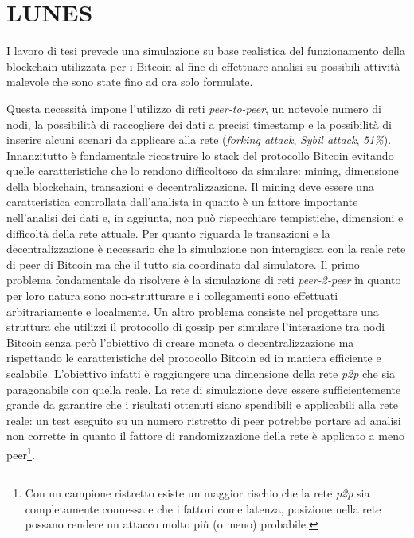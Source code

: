 \chapter{LUNES}
I lavoro di tesi prevede una simulazione su base realistica del funzionamento della blockchain utilizzata per i Bitcoin al fine di effettuare analisi su possibili attività malevole che sono state fino ad ora solo formulate.

Questa necessità impone l'utilizzo di reti \textit{peer-to-peer}, un notevole numero di nodi, la possibilità di raccogliere dei dati a precisi timestamp e la possibilità di inserire alcuni scenari da applicare alla rete (\textit{forking attack}, \textit{Sybil attack}, \textit{51\%}).\newline\newline
Innanzitutto è fondamentale ricostruire lo stack del protocollo Bitcoin evitando quelle caratteristiche che lo rendono difficoltoso da simulare: mining, dimensione della blockchain, transazioni e decentralizzazione.\newline
Il mining deve essere una caratteristica controllata dall'analista in quanto è un fattore importante nell'analisi dei dati e, in aggiunta, non può rispecchiare tempistiche, dimensioni e difficoltà della rete attuale.\newline
Per quanto riguarda le transazioni e la decentralizzazione è necessario che la simulazione non interagisca con la reale rete di peer di Bitcoin ma che il tutto sia coordinato dal simulatore.\newline
Il primo problema fondamentale da risolvere è la simulazione di reti \textit{peer-2-peer} in quanto per loro natura sono non-strutturare e i collegamenti sono effettuati arbitrariamente e localmente. Un altro problema consiste nel progettare una struttura che utilizzi il protocollo di gossip per simulare l'interazione tra nodi Bitcoin senza però l'obiettivo di creare moneta o decentralizzazione ma rispettando le caratteristiche del protocollo Bitcoin ed in maniera efficiente e scalabile. L'obiettivo infatti è raggiungere una dimensione della rete \textit{p2p} che sia paragonabile con quella reale. La rete di simulazione deve essere sufficientemente grande da garantire che i risultati ottenuti siano spendibili e applicabili alla rete reale: un test eseguito su un numero ristretto di peer potrebbe portare ad analisi non corrette in quanto il fattore di randomizzazione della rete è applicato a meno peer\footnote{Con un campione ristretto esiste un maggior rischio che la rete \textit{p2p} sia completamente connessa e che i fattori come latenza, posizione nella rete possano rendere un attacco molto più (o meno) probabile.}.
